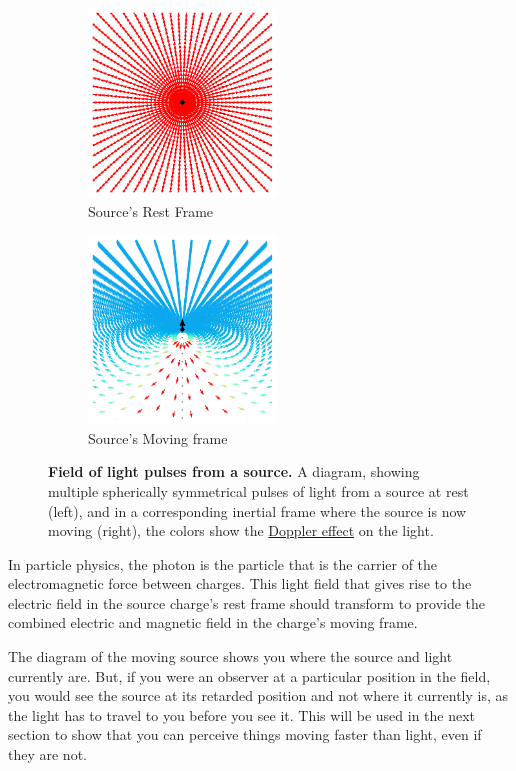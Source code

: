 \begin{figure}[H]
	\begin{subfigure}{.49\textwidth}
		\centering
		\includegraphics[width = 5cm]{images/pdf/Field_Rest_Frame.pdf}
		\caption{Source's Rest Frame}
		\label{fig: multiple emitting pulses rest frame}
	\end{subfigure}
	\begin{subfigure}{.49\textwidth}
		\centering
		\includegraphics[width = 5cm]{images/pdf/Field_Moving_Frame_Doppler.pdf}
		\caption{Source's Moving frame}
		\label{fig: multiple emitting pulses moving frame}
	\end{subfigure}
	\caption{\textbf{Field of light pulses from a source.} A diagram, showing multiple spherically symmetrical pulses of light from a source at rest (left), and in a corresponding inertial frame where the source is now moving (right), the colors show the \protect\hyperlink{def-doppler-effect}{Doppler effect} on the light.} %
	\label{fig: full field transformation 0}
\end{figure}

In particle physics, the photon is the particle that is the carrier of the electromagnetic force between charges.
This light field that gives rise to the electric field in the source charge's rest frame should transform to provide the combined electric and magnetic field in the charge's moving frame.

The diagram of the moving source shows you where the source and light currently are.
But, if you were an observer at a particular position in the field, you would see the source at its retarded position and not where it currently is, as the light has to travel to you before you see it.
This will be used in the next section to show that you can perceive things moving faster than light, even if they are not.

